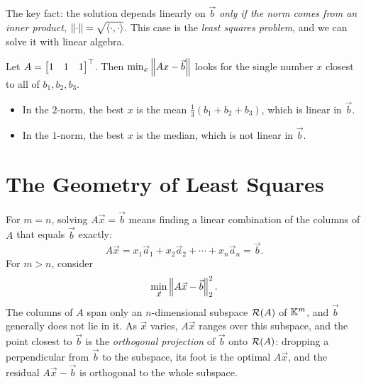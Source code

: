 The key fact: the solution depends linearly on $\vec{b}$ \emph{only if the norm comes from an inner product}, $\left\lVert \cdot \right\rVert = \sqrt{\left\langle \cdot, \cdot \right\rangle}$. This case is the \emph{least squares problem}, and we can solve it with linear algebra.

\begin{example}
  Let $A = \begin{bmatrix} 1 & 1 & 1 \end{bmatrix}^\top$. Then $\min_x \left\lVert Ax - \vec{b} \right\rVert$ looks for the single number $x$ closest to all of $b_1, b_2, b_3$.
  \begin{itemize}
    \item In the $2$-norm, the best $x$ is the mean $\frac{1}{3}(b_1 + b_2 + b_3)$, which is linear in $\vec{b}$.
    \item In the $1$-norm, the best $x$ is the median, which is not linear in $\vec{b}$.
  \end{itemize}
\end{example}

\section{The Geometry of Least Squares}

For $m = n$, solving $A\vec{x} = \vec{b}$ means finding a linear combination of the columns of $A$ that equals $\vec{b}$ exactly:
\begin{equation}
  A\vec{x} = x_1\vec{a}_1 + x_2\vec{a}_2 + \cdots + x_n\vec{a}_n = \vec{b}.
\end{equation}
For $m > n$, consider
\begin{equation}
  \min_{\vec{x}} \left\lVert A\vec{x} - \vec{b} \right\rVert_2^2.
\end{equation}
The columns of $A$ span only an $n$-dimensional subspace $\mathcal{R}(A)$ of $\mathbb{K}^m$, and $\vec{b}$ generally does not lie in it. As $\vec{x}$ varies, $A\vec{x}$ ranges over this subspace, and the point closest to $\vec{b}$ is the \emph{orthogonal projection} of $\vec{b}$ onto $\mathcal{R}(A)$: dropping a perpendicular from $\vec{b}$ to the subspace, its foot is the optimal $A\vec{x}$, and the residual $A\vec{x} - \vec{b}$ is orthogonal to the whole subspace.

\begin{center}
\end{center}

